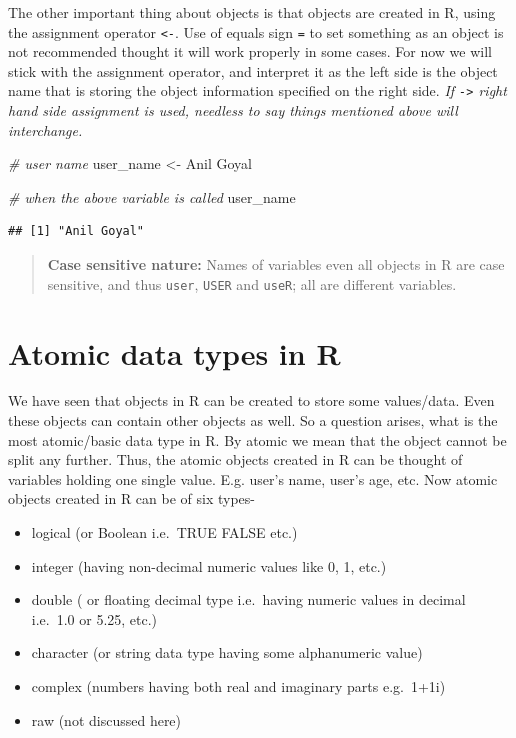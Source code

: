 \documentclass[
]{book}
\newenvironment{Shaded}{\begin{snugshade}}{\end{snugshade}}
\newcommand{\CommentTok}[1]{\textcolor[rgb]{0.56,0.35,0.01}{\textit{#1}}}
\newcommand{\NormalTok}[1]{#1}
\newcommand{\OtherTok}[1]{\textcolor[rgb]{0.56,0.35,0.01}{#1}}
\newcommand{\StringTok}[1]{\textcolor[rgb]{0.31,0.60,0.02}{#1}}
\providecommand{\tightlist}{%
  \setlength{\itemsep}{0pt}\setlength{\parskip}{0pt}}
\begin{document}
The other important thing about objects is that objects are created in R, using the assignment operator \texttt{\textless{}-}. Use of equals sign \texttt{=} to set something as an object is not recommended thought it will work properly in some cases. For now we will stick with the assignment operator, and interpret it as the left side is the object name that is storing the object information specified on the right side. \emph{If \texttt{-\textgreater{}} right hand side assignment is used, needless to say things mentioned above will interchange.}

\begin{Shaded}
\begin{Highlighting}[]
\CommentTok{\# user name}
\NormalTok{user\_name }\OtherTok{\textless{}{-}} \StringTok{\textquotesingle{}Anil Goyal\textquotesingle{}}

\CommentTok{\# when the above variable is called}
\NormalTok{user\_name}
\end{Highlighting}
\end{Shaded}

\begin{verbatim}
## [1] "Anil Goyal"
\end{verbatim}

\begin{quote}
\textbf{Case sensitive nature:} Names of variables even all objects in R are case sensitive, and thus \texttt{user}, \texttt{USER} and \texttt{useR}; all are different variables.
\end{quote}

\hypertarget{atomic-data-types-in-r}{%
\section{Atomic data types in R}\label{atomic-data-types-in-r}}

We have seen that objects in R can be created to store some values/data. Even these objects can contain other objects as well. So a question arises, what is the most atomic/basic data type in R. By atomic we mean that the object cannot be split any further. Thus, the atomic objects created in R can be thought of variables holding one single value. E.g. user's name, user's age, etc. Now atomic objects created in R can be of six types-

\begin{itemize}
\tightlist
\item
  logical (or Boolean i.e.~TRUE FALSE etc.)
\item
  integer (having non-decimal numeric values like 0, 1, etc.)
\item
  double ( or floating decimal type i.e.~having numeric values in decimal i.e.~1.0 or 5.25, etc.)
\item
  character (or string data type having some alphanumeric value)
\item
  complex (numbers having both real and imaginary parts e.g.~1+1i)
\item
  raw (not discussed here)
\end{itemize}
\end{document}

